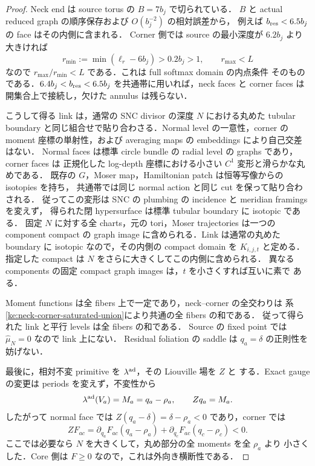 \begin{proof}
Neck end は source torus の $B=7b_j$ で切られている．
$B$ と actual reduced graph の順序保存および $O(b_j^{-2})$ の相対誤差から，
例えば $b_{\rm res}<6.5b_j$ の face はその内側に含まれる．
Corner 側では source の最小深度が $6.2b_j$ より大きければ
\[
 r_{\min}:=\min(\ell_r-6b_j)>0.2b_j>1,\qquad r_{\max}<L
\]
なので $r_{\max}/r_{\min}<L$ である．これは full softmax domain の内点条件
そのものである．$6.4b_j<b_{\rm res}<6.5b_j$ を共通帯に用いれば，neck faces と
corner faces は開集合上で接続し，欠けた annulus は残らない．

こうして得る link は，通常の SNC divisor の深度 $N$ における丸めた tubular
boundary と同じ組合せで貼り合わさる．Normal level の一意性，corner の moment
座標の単射性，および averaging maps の embeddings により自己交差はない．
Normal faces は標準 circle bundle の radial level の graphs であり，corner faces は
正規化した log-depth 座標における小さい $C^1$ 変形と滑らかな丸めである．
既存の $G$，Moser map，Hamiltonian patch は恒等写像からの isotopies を持ち，
共通帯では同じ normal action と同じ cut を保って貼り合わされる．
従ってこの変形は SNC の plumbing の incidence と meridian framings を変えず，
得られた閉 hypersurface は標準 tubular boundary に isotopic である．
固定 $N$ に対する全 charts，元の tori，Moser trajectories は一つの
component compact の graph image に含められる．Link は通常の丸めた boundary に
isotopic なので，その内側の compact domain を $K_{i,j,t}$ と定める．
指定した compact は $N$ をさらに大きくしてこの内側に含められる．
異なる components の固定 compact graph images は，$t$ を小さくすれば互いに素で
ある．

Moment functions は全 fibers 上で一定であり，neck--corner の全交わりは
系\ref{ke:neck-corner-saturated-union}により共通の全 fibers の和である．
従って得られた link と平行 levels は全 fibers の和である．
Source の fixed point では $\widehat\mu_N=0$ なので link 上にない．
Residual foliation の saddle は $q_a=\delta$ の正則性を妨げない．

最後に，相対不変 primitive を $\lambda^{\rm ad}$，その Liouville 場を $Z$ と
する．Exact gauge の変更は periods を変えず，不変性から
\[
 \lambda^{\rm ad}(V_a)=M_a=q_a-\rho_a,\qquad Zq_a=M_a.
\]
したがって normal face では $Z(q_a-\delta)=\delta-\rho_a<0$ であり，corner では
\[
 ZF_{ac}
 =\partial_{q_a}F_{ac}(q_a-\rho_a)
  +\partial_{q_c}F_{ac}(q_c-\rho_c)<0.
\]
ここでは必要なら $N$ を大きくして，丸め部分の全 moments を全 $\rho_a$ より
小さくした．Core 側は $F\ge0$ なので，これは外向き横断性である．
\end{proof}

